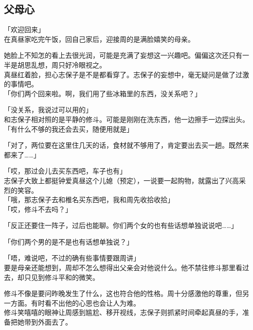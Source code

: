 \subsection{父母心}

「欢迎回来」\\

在真昼家吃完午饭，回自己家后，迎接周的是满脸嬉笑的母亲。

她脸上不知怎的看上去很光润，可能是充满了妄想这一兴趣吧。偏偏这次还只有一半是胡思乱想，周只好冷眼视之。\\

真昼红着脸，担心志保子是不是都看穿了。志保子的妄想中，毫无疑问是做了过激的事情吧。\\

「你们两个回来啦。啊，我们用了些冰箱里的东西，没关系吧？」

「没关系，我说过可以用的」\\

和志保子相对照的是平静的修斗。可能是刚刚在洗东西，他一边擦手一边探出头。\\

「有什么不够的我还会去买，随便用就是」

「对了，两位要在这里住几天的话，食材就不够用了，肯定要出去买一趟。既然来都来了……」

「哎，那过会儿去买东西吧，车子也有」\\

志保子大致上都挺钟爱真昼这个儿媳（预定），一说要一起购物，就露出了兴高采烈的笑容。\\

「哦，那志保子去和椎名买东西吧，我和周先收拾收拾」\\

「哎，修斗不去吗？」

「反正还要住一阵子，过后也能聊。你们两个女的也有些话想单独说说吧……」

「你们两个男的是不是也有话想单独说？」

「唔，难说吧，不过的确有些事情要跟周讲」\\

要是母亲还能想到，周却不怎么想得出父亲会对他说什么。他不禁往修斗那里看过去，却只见到修斗平和的微笑。

修斗不像是要问昨晚发生了什么，这也符合他的性格。周十分感激他的尊重，但另一方面。有时看不出他的心思也会让人为难。\\

修斗笑嘻嘻的眼神让周感到尴尬、移开视线，志保子则抓紧时间牵起真昼的手，准备把她带到外面去了。

